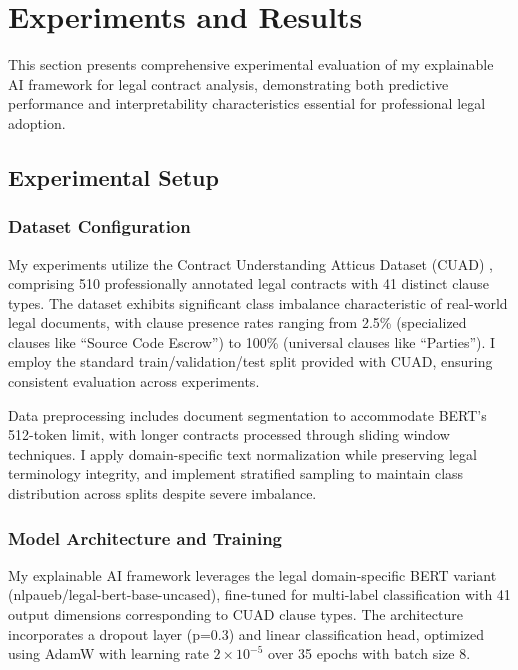 \section{Experiments and Results}
\label{sec:experiments}

This section presents comprehensive experimental evaluation of my explainable AI framework for legal contract analysis, demonstrating both predictive performance and interpretability characteristics essential for professional legal adoption.

\subsection{Experimental Setup}
\label{subsec:experimental_setup}

\subsubsection{Dataset Configuration}
My experiments utilize the Contract Understanding Atticus Dataset (CUAD) \cite{hendrycks2021cuad}, comprising 510 professionally annotated legal contracts with 41 distinct clause types. The dataset exhibits significant class imbalance characteristic of real-world legal documents, with clause presence rates ranging from 2.5\% (specialized clauses like ``Source Code Escrow'') to 100\% (universal clauses like ``Parties''). I employ the standard train/validation/test split provided with CUAD, ensuring consistent evaluation across experiments.

Data preprocessing includes document segmentation to accommodate BERT's 512-token limit, with longer contracts processed through sliding window techniques. I apply domain-specific text normalization while preserving legal terminology integrity, and implement stratified sampling to maintain class distribution across splits despite severe imbalance.

\subsubsection{Model Architecture and Training}
My explainable AI framework leverages the legal domain-specific BERT variant (nlpaueb/legal-bert-base-uncased), fine-tuned for multi-label classification with 41 output dimensions corresponding to CUAD clause types. The architecture incorporates a dropout layer (p=0.3) and linear classification head, optimized using AdamW with learning rate $2 \times 10^{-5}$ over 35 epochs with batch size 8.

